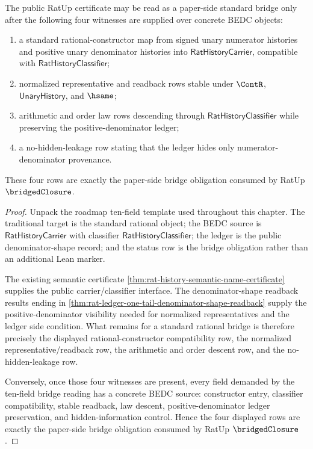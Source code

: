 \begin{theorem}
\label{thm:ratup-bridged-closure-obligation-package}
The public RatUp certificate may be read as a paper-side standard bridge only
after the following four witnesses are supplied over concrete BEDC objects:
\begin{enumerate}
\item a standard rational-constructor map from signed unary numerator histories
and positive unary denominator histories into $\mathsf{RatHistoryCarrier}$,
compatible with $\mathsf{RatHistoryClassifier}$;
\item normalized representative and readback rows stable under $\ContR$,
$\mathsf{UnaryHistory}$, and $\hsame$;
\item arithmetic and order law rows descending through
$\mathsf{RatHistoryClassifier}$ while preserving the positive-denominator
ledger;
\item a no-hidden-leakage row stating that the ledger hides only
numerator-denominator provenance.
\end{enumerate}
These four rows are exactly the paper-side bridge obligation consumed by RatUp
$\bridgedClosure$.
\end{theorem}
\begin{proof}
Unpack the roadmap ten-field template used throughout this chapter. The
traditional target is the standard rational object; the BEDC source is
$\mathsf{RatHistoryCarrier}$ with classifier
$\mathsf{RatHistoryClassifier}$; the ledger is the public denominator-shape
record; and the status row is the bridge obligation rather than an additional
Lean marker.

The existing semantic certificate
\autoref{thm:rat-history-semantic-name-certificate} supplies the public
carrier/classifier interface. The denominator-shape readback results ending in
\autoref{thm:rat-ledger-one-tail-denominator-shape-readback} supply the
positive-denominator visibility needed for normalized representatives and the
ledger side condition. What remains for a standard rational bridge is therefore
precisely the displayed rational-constructor compatibility row, the normalized
representative/readback row, the arithmetic and order descent row, and the
no-hidden-leakage row.

Conversely, once those four witnesses are present, every field demanded by the
ten-field bridge reading has a concrete BEDC source: constructor entry,
classifier compatibility, stable readback, law descent, positive-denominator
ledger preservation, and hidden-information control. Hence the four displayed
rows are exactly the paper-side bridge obligation consumed by RatUp
$\bridgedClosure$.
\end{proof}
